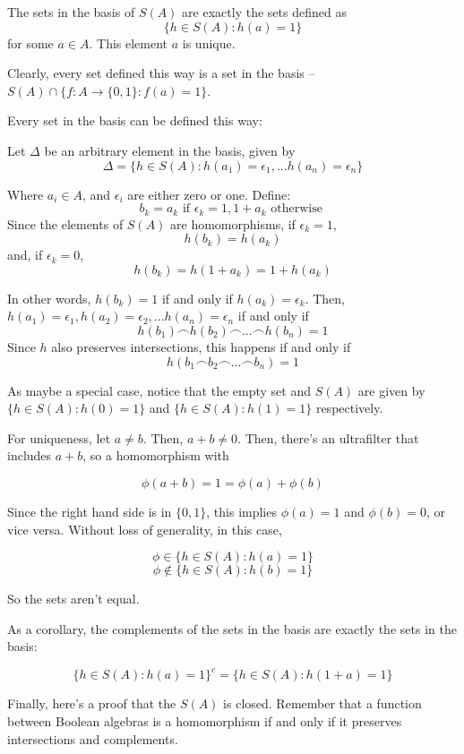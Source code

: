 \documentclass{article}
\begin{document}
      The sets in the basis of $S(A)$ are exactly the sets defined as
      \[\{h\in S(A): h(a) = 1\}\]
      for some $a \in A$. This element $a$ is unique.

      Clearly, every set defined this way is a set in the basis -- $S(A) \cap
      \{f: A \rightarrow \{0,1\} : f(a) = 1\}$.

      Every set in the basis can be defined this way:

      Let $\Delta$ be an arbitrary element in the basis, given by
      \[\Delta = \{h \in S(A) : h(a_1) = \epsilon_1, ... h(a_n) = \epsilon_n\}\]

      Where $a_i \in A$, and $\epsilon_i$ are either zero or one. Define:
      \[b_k = a_k \text{ if } \epsilon_k = 1, 1+a_k \text{ otherwise }\]
      Since the elements of $S(A)$ are homomorphisms, if $\epsilon_k = 1$,
      \[h(b_k) = h(a_k)\]
      and, if $\epsilon_k = 0$,
      \[h(b_k) = h(1+a_k) = 1+h(a_k)\]

      In other words, $h(b_k) = 1$ if and only if $h(a_k) = \epsilon_k$. Then,
      $h(a_1) = \epsilon_1, h(a_2) = \epsilon_2, ... h(a_n) = \epsilon_n$
      if and only if
      \[h(b_1) \frown h(b_2) \frown ... \frown h(b_n) = 1\]
      Since $h$ also preserves intersections, this happens if and only if
      \[h(b_1 \frown b_2 \frown ... \frown b_n) = 1\]

      As maybe a special case, notice that the empty set and $S(A)$ are given
      by $\{h \in S(A) : h(0) = 1\}$ and $\{h \in S(A) : h(1) = 1\}$
      respectively.

      For uniqueness, let $a \neq b$. Then, $a+b \neq 0$.
      Then, there's an ultrafilter that includes $a+b$, so a homomorphism with
      
      \[\phi(a+b) = 1 = \phi(a) + \phi(b)\]

      Since the right hand side is in $\{0,1\}$, this implies $\phi(a) = 1$ and
      $\phi(b) = 0$, or vice versa. Without loss of generality, in this case,

      \[\phi \in \{h \in S(A): h(a) = 1\}\]
      \[\phi \notin \{h \in S(A) : h(b) = 1\}\]

      So the sets aren't equal.

      As a corollary, the complements of the sets in the basis are exactly the
      sets in the basis:

      \[\{h \in S(A) : h(a) = 1\}^c = \{h \in S(A) : h(1+a) = 1\}\]

      Finally, here's a proof that the $S(A)$ is closed. Remember that a
      function between Boolean algebras is a homomorphism if and only if it
      preserves intersections and complements.
\end{document}
